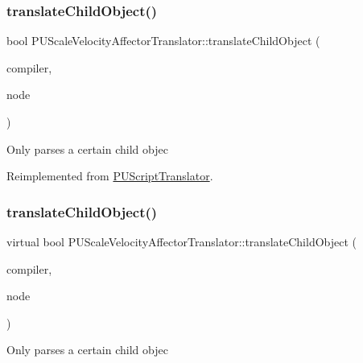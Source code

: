 \subsubsection{\texorpdfstring{translate\+Child\+Object()}{translateChildObject()}\hspace{0.1cm}{\footnotesize\ttfamily [1/2]}}
{\footnotesize\ttfamily bool P\+U\+Scale\+Velocity\+Affector\+Translator\+::translate\+Child\+Object (\begin{DoxyParamCaption}\item[{\hyperlink{classPUScriptCompiler}{P\+U\+Script\+Compiler} $\ast$}]{compiler,  }\item[{\hyperlink{classPUAbstractNode}{P\+U\+Abstract\+Node} $\ast$}]{node }\end{DoxyParamCaption})\hspace{0.3cm}{\ttfamily [virtual]}}

Only parses a certain child objec 

Reimplemented from \hyperlink{classPUScriptTranslator_ab587d01348ae3e678cb700c719b2b113}{P\+U\+Script\+Translator}.

\mbox{\label{classPUScaleVelocityAffectorTranslator_ace18f757856e57ac4e987e6764588d5c}} 
\subsubsection{\texorpdfstring{translate\+Child\+Object()}{translateChildObject()}\hspace{0.1cm}{\footnotesize\ttfamily [2/2]}}
{\footnotesize\ttfamily virtual bool P\+U\+Scale\+Velocity\+Affector\+Translator\+::translate\+Child\+Object (\begin{DoxyParamCaption}\item[{\hyperlink{classPUScriptCompiler}{P\+U\+Script\+Compiler} $\ast$}]{compiler,  }\item[{\hyperlink{classPUAbstractNode}{P\+U\+Abstract\+Node} $\ast$}]{node }\end{DoxyParamCaption})\hspace{0.3cm}{\ttfamily [virtual]}}

Only parses a certain child objec 

